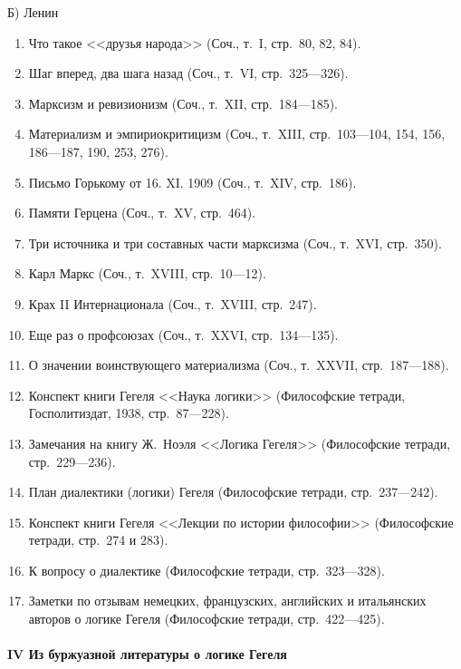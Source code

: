{\centering Б) Ленин \par}

\begin{enumerate}
\item Что такое <<друзья народа>> (Соч., т.~I, стр.~80, 82, 84).
\item Шаг вперед, два шага назад (Соч., т.~VI, стр.~325---326).
\item Марксизм и ревизионизм (Соч., т.~XII, стр.~184---185).
\item Материализм и эмпириокритицизм (Соч., т.~XIII, стр.~103---104, 154, 156,
186---187, 190, 253, 276).
\item Письмо Горькому от 16. XI. 1909 (Соч., т.~XIV, стр.~186).
\item Памяти Герцена (Соч., т.~XV, стр.~464).
\item Три источника и три составных части марксизма (Соч., т.~XVI, стр.~350).
\item Карл Маркс (Соч., т.~XVIII, стр.~10---12).
\item Крах II Интернационала (Соч., т.~XVIII, стр.~247).
\item Еще раз о профсоюзах (Соч., т.~XXVI, стр.~134---135).
\item О значении воинствующего материализма (Соч., т.~XXVII, стр.~187---188).
\item Конспект книги Гегеля <<Наука логики>> (Философские тетради, Госполитиздат,
1938, стр.~87---228).
\item Замечания на книгу Ж.~Ноэля <<Логика Гегеля>> (Философские тетради,
стр.~229---236).
\item План диалектики (логики) Гегеля (Философские тетради, стр.~237---242).
\item Конспект книги Гегеля <<Лекции по истории философии>> (Философские тетради,
стр.~274 и 283).
\item К вопросу о диалектике (Философские тетради, стр.~323---328).
\item Заметки по отзывам немецких, французских, английских и итальянских авторов
о логике Гегеля (Философские тетради, стр.~422---425).
\end{enumerate}

\paragraph[IV Из буржуазной литературы о логике Гегеля]
{IV Из буржуазной литературы о логике Гегеля}

